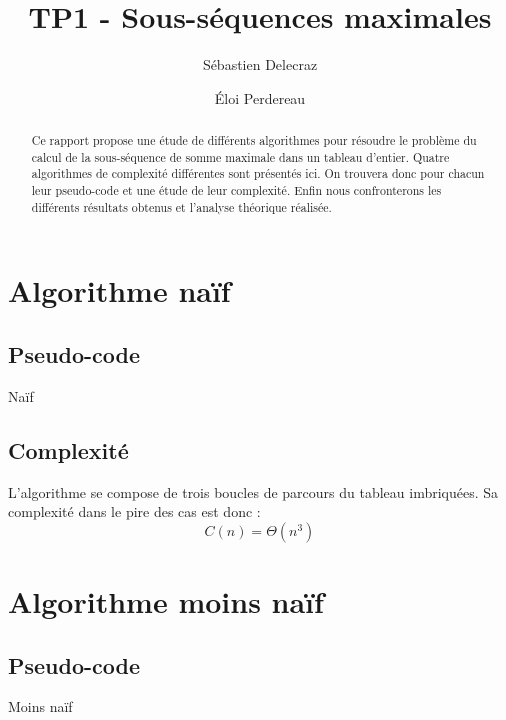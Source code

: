 \documentclass[11pt, a4paper]{article}
\title{TP1 - Sous-séquences maximales}
\author{Sébastien Delecraz \and \'Eloi Perdereau}
\begin{document}
\maketitle

\begin{abstract}
  Ce rapport propose une étude de différents algorithmes pour résoudre le
  problème du calcul de la sous-séquence de somme maximale dans un tableau
  d'entier. Quatre algorithmes de complexité différentes sont présentés ici.
  On trouvera donc pour chacun leur pseudo-code et une étude de leur
  complexité. Enfin nous confronterons les
  différents résultats obtenus et l'analyse théorique réalisée.
\end{abstract}

\section{Algorithme naïf}
\subsection{Pseudo-code}

\begin{algorithm}[H]
  \caption{Naïf}
\end{algorithm}
\subsection{Complexité}
L'algorithme se compose de trois boucles de parcours du tableau imbriquées. Sa
complexité dans le pire des cas est donc :
\[C(n) = \Theta{(n^3)}\]

\section{Algorithme moins naïf}
\subsection{Pseudo-code}

\begin{algorithm}[H]
  \caption{Moins naïf}
\end{algorithm}
\end{document}
